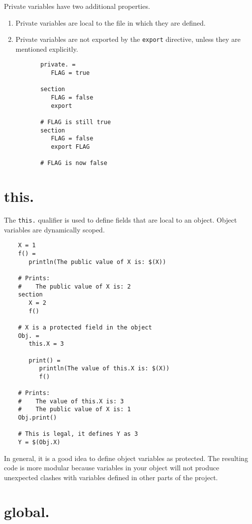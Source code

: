 Private variables have two additional properties.

\begin{enumerate}
\item Private variables are local to the file in which they are defined.
\item Private variables are not exported by the \verb+export+ directive, unless they are
  mentioned explicitly.

  \begin{verbatim}
       private. =
          FLAG = true

       section
          FLAG = false
          export

       # FLAG is still true
       section
          FLAG = false
          export FLAG

       # FLAG is now false
  \end{verbatim}
\end{enumerate}

\section{this.}

The \verb+this.+ qualifier is used to define fields that are local to an object.
Object variables are dynamically scoped.

\begin{verbatim}
    X = 1
    f() =
       println(The public value of X is: $(X))

    # Prints:
    #    The public value of X is: 2
    section
       X = 2
       f()

    # X is a protected field in the object
    Obj. =
       this.X = 3

       print() =
          println(The value of this.X is: $(X))
          f()

    # Prints:
    #    The value of this.X is: 3
    #    The public value of X is: 1
    Obj.print()

    # This is legal, it defines Y as 3
    Y = $(Obj.X)
\end{verbatim}

In general, it is a good idea to define object variables as protected.  The resulting code is more
modular because variables in your object will not produce unexpected clashes with variables defined
in other parts of the project.

\section{global.}
\label{section:global}

